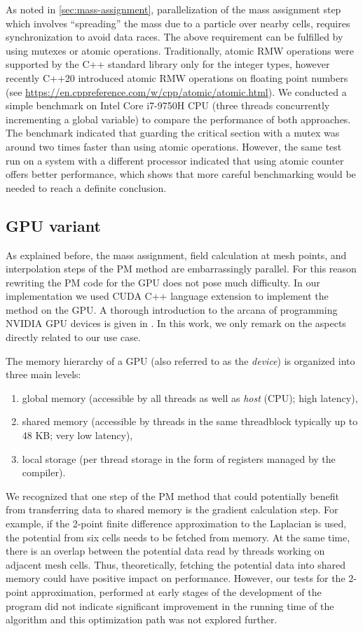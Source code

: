 As noted in \autoref{sec:mass-assignment}, parallelization of the mass assignment step which involves ``spreading'' the mass due to a particle over nearby cells, requires synchronization to avoid data races.
The above requirement can be fulfilled by using mutexes or atomic operations.
Traditionally, atomic RMW operations were supported by the C++ standard library only for the integer types, however recently C++20 introduced atomic RMW operations on floating point numbers (see \url{https://en.cppreference.com/w/cpp/atomic/atomic.html}).
We conducted a simple benchmark on Intel Core i7-9750H CPU (three threads concurrently incrementing a global variable) to compare the performance of both approaches.
The benchmark indicated that guarding the critical section with a mutex was around two times faster than using atomic operations.
However, the same test run on a system with a different processor indicated that using atomic counter offers better performance, which shows that more careful benchmarking would be needed to reach a definite conclusion.

\subsection{GPU variant}\label{subsec:gpu-variant}
As explained before, the mass assignment, field calculation at mesh points, and interpolation steps of the PM method are embarrassingly parallel.
For this reason rewriting the PM code for the GPU does not pose much difficulty.
In our implementation we used CUDA C++ language extension to implement the method on the GPU.
A thorough introduction to the arcana of programming NVIDIA GPU devices is given in \cite{nvidia2025cuda}.
In this work, we only remark on the aspects directly related to our use case.

The memory hierarchy of a GPU (also referred to as the \textit{device}) is organized into three main levels:
\begin{enumerate}
    \item global memory (accessible by all threads as well as \textit{host} (CPU); high latency),
    \item shared memory (accessible by threads in the same threadblock typically up to 48 KB; very low latency),
    \item local storage (per thread storage in the form of registers managed by the compiler).
\end{enumerate}
We recognized that one step of the PM method that could potentially benefit from transferring data to shared memory is the gradient calculation step.
For example, if the 2-point finite difference approximation to the Laplacian is used, the potential from six cells needs to be fetched from memory.
At the same time, there is an overlap between the potential data read by threads working on adjacent mesh cells.
Thus, theoretically, fetching the potential data into shared memory could have positive impact on performance.
However, our tests for the 2-point approximation, performed at early stages of the development of the program did not indicate significant improvement in the running time of the algorithm and this optimization path was not explored further.

